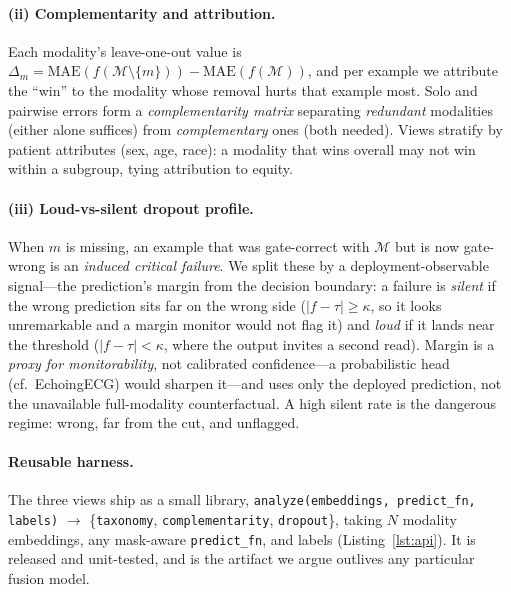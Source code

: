 \documentclass{article}
\begin{document}
\paragraph{(ii) Complementarity and attribution.} Each modality's leave-one-out value is
$\Delta_m{=}\mathrm{MAE}(f(\mathcal{M}{\setminus}\{m\}))-\mathrm{MAE}(f(\mathcal{M}))$, and per
example we attribute the ``win'' to the modality whose removal hurts that example most. Solo and
pairwise errors form a \emph{complementarity matrix} separating \emph{redundant} modalities (either
alone suffices) from \emph{complementary} ones (both needed). Views stratify by patient attributes
(sex, age, race): a modality that wins overall may not win within a subgroup, tying attribution to
equity.

\paragraph{(iii) Loud-vs-silent dropout profile.} When $m$ is missing, an example that was
gate-correct with $\mathcal{M}$ but is now gate-wrong is an \emph{induced critical failure}. We split
these by a deployment-observable signal---the prediction's margin from the decision boundary: a
failure is \emph{silent} if the wrong prediction sits far on the wrong side ($|f-\tau|\ge\kappa$, so
it looks unremarkable and a margin monitor would not flag it) and \emph{loud} if it lands near the
threshold ($|f-\tau|<\kappa$, where the output invites a second read). Margin is a \emph{proxy for
monitorability}, not calibrated confidence---a probabilistic head (cf.\ EchoingECG) would sharpen
it---and uses only the deployed prediction, not the unavailable full-modality counterfactual. A high
silent rate is the dangerous regime: wrong, far from the cut, and unflagged.

\paragraph{Reusable harness.} The three views ship as a small library,
\mbox{\texttt{analyze(embeddings, predict\_fn, labels)}} $\rightarrow$
\{\texttt{taxonomy}, \texttt{complementarity}, \texttt{dropout}\}, taking $N$ modality embeddings,
any mask-aware \texttt{predict\_fn}, and labels (Listing~\ref{lst:api}). It is released and
unit-tested, and is the artifact we argue outlives any particular fusion model.
\end{document}
